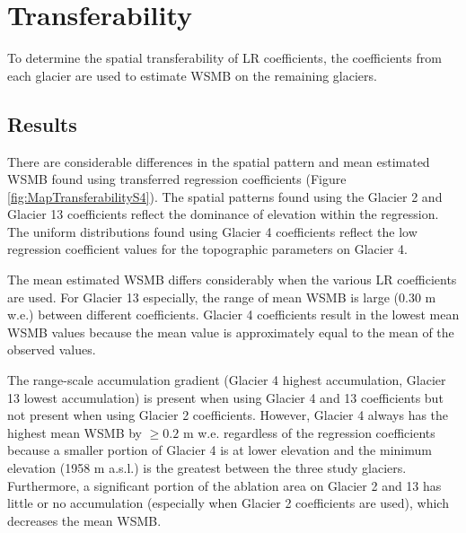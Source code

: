 \documentclass[12pt]{article}
\begin{document}
\section{Transferability}
\label{sec:transferability}

To determine the spatial transferability of LR coefficients, the coefficients from each glacier are used to estimate WSMB on the remaining glaciers. 


\subsection{Results}

There are considerable differences in the spatial pattern and mean estimated WSMB found using transferred regression coefficients (Figure \ref{fig:MapTransferabilityS4}). The spatial patterns found using the Glacier 2 and Glacier 13 coefficients reflect the dominance of elevation within the regression. The uniform distributions found using Glacier 4 coefficients reflect the low regression coefficient values for the topographic parameters on Glacier 4. 

The mean estimated WSMB differs considerably when the various LR coefficients are used. For Glacier 13 especially, the range of mean WSMB is large (0.30 m w.e.) between different coefficients. Glacier 4 coefficients result in the lowest mean WSMB values because the mean value is approximately equal to the mean of the observed values.

The range-scale accumulation gradient (Glacier 4 highest accumulation, Glacier 13 lowest accumulation) is present when using Glacier 4 and 13 coefficients but not present when using Glacier 2 coefficients. However, Glacier 4 always has the highest mean WSMB by $\geq0.2$ m w.e. regardless of the regression coefficients because a smaller portion of Glacier 4 is at lower elevation and the minimum elevation (1958 m a.s.l.) is the greatest between the three study glaciers. Furthermore, a significant portion of the ablation area on Glacier 2 and 13 has little or no accumulation (especially when Glacier 2 coefficients are used), which decreases the mean WSMB.  
\end{document}
